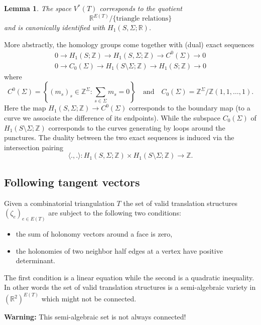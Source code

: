 \documentclass[a4paper,12pt]{article}
\def\bR{\mathbb{R}}
\def\bZ{\mathbb{Z}}
\newtheorem{lemma}[definition]{Lemma}
\begin{document}
\begin{lemma}
\label{sec:VT:dual}
The space $V^*(T)$ corresponds to the quotient
\[
\bR^{E(T)} / \{\text{triangle relations}\}
\]
and is canonically identified with $H_1(S, \Sigma; \bR)$.
\end{lemma}

More abstractly, the homology groups come together with (dual) exact sequences
\begin{align}
0 \to H_1(S; \bZ) \to H_1(S, \Sigma; \bZ) \to C^0(\Sigma) \to 0 \\
0 \to C_0(\Sigma) \to H_1(S \setminus \Sigma; \bZ) \to H_1(S; \bZ) \to 0
\end{align}
where
\[
C^0(\Sigma) = \left\{(m_s)_s \in \bZ^\Sigma: \sum_{s\in\Sigma} m_s = 0 \right\}
\quad \text{and} \quad
C_0(\Sigma) = \bZ^\Sigma / \bZ (1,1,\ldots,1).
\]
Here the map $H_1(S, \Sigma; \bZ) \to C^0(\Sigma)$ corresponds to the boundary map
(to a curve we associate the difference of its endpoints). While the subspace $C_0(\Sigma)$
of $H_1(S \setminus \Sigma; \bZ)$ corresponds to the curves generating by loops around the
punctures. The duality between the two exact sequences is induced via the intersection pairing
\[
\langle .,. \rangle: H_1(S, \Sigma; \bZ) \times H_1(S \setminus \Sigma; \bZ) \to \bZ.
\]

\subsection{Following tangent vectors}
Given a combinatorial triangulation $T$ the set of valid translation structures $(\zeta_e)_{e \in E(T)}$
are subject to the following two conditions:
\begin{itemize}
\item the sum of holonomy vectors around a face is zero,
\item the holonomies of two neighbor half edges at a vertex have positive determinant.
\end{itemize}
The first condition is a linear equation while the second is a quadratic inequality.
In other words the set of valid translation structures is a semi-algebraic variety
in $(\bR^2)^{E(T)}$ which might not be connected.

\textbf{Warning:} This semi-algebraic set is not always connected!
\end{document}
